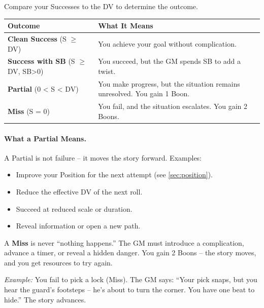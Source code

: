 Compare your Successes to the DV to determine the outcome.

\begin{tcolorbox}[colback=gray!5!white,colframe=gray!70!black,title=\textbf{Outcome Matrix},breakable]
\begin{center}
\begin{tabular}{ll}
\toprule
\textbf{Outcome} & \textbf{What It Means} \\
\midrule
\textbf{Clean Success} (S $\geq$ DV) & You achieve your goal without complication. \\
\textbf{Success with SB} (S $\geq$ DV, SB>0) & You succeed, but the GM spends SB to add a twist. \\
\textbf{Partial} (0 < S < DV) & You make progress, but the situation remains unresolved. You gain 1 Boon. \\
\textbf{Miss} (S = 0) & You fail, and the situation escalates. You gain 2 Boons. \\
\bottomrule
\end{tabular}
\end{center}
\end{tcolorbox}

\paragraph{What a Partial Means.}
A Partial is not failure -- it moves the story forward. Examples:
\begin{itemize}
  \item Improve your Position for the next attempt (see \ref{sec:position}).
  \item Reduce the effective DV of the next roll.
  \item Succeed at reduced scale or duration.
  \item Reveal information or open a new path.
\end{itemize}

\begin{tcolorbox}[colback=red!5!white,colframe=red!75!black,title=\textbf{Fail Forward},breakable]
  A \textbf{Miss} is never ``nothing happens.''  
  The GM must introduce a complication, advance a timer, or reveal a hidden danger.  
  You gain 2 Boons -- the story moves, and you get resources to try again.
  
  \textit{Example:} You fail to pick a lock (Miss). The GM says: ``Your pick snaps, but you hear the guard's footsteps -- he's about to turn the corner. You have one beat to hide.'' The story advances.
\end{tcolorbox}


